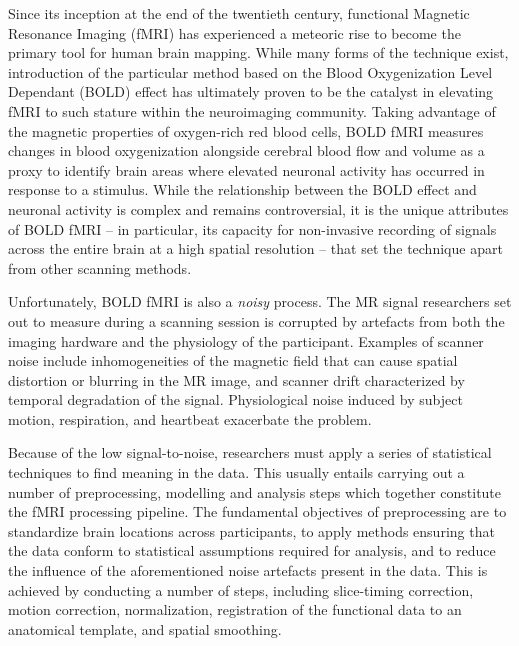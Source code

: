 Since its inception at the end of the twentieth century, functional Magnetic Resonance Imaging (fMRI) has experienced a meteoric rise to become the primary tool for human brain mapping. While many forms of the technique exist, introduction of the particular method based on the Blood Oxygenization Level Dependant (BOLD) effect has ultimately proven to be the catalyst in elevating fMRI to such stature within the neuroimaging community. Taking advantage of the magnetic properties of oxygen-rich red blood cells, BOLD fMRI measures changes in blood oxygenization alongside cerebral blood flow and volume as a proxy to identify brain areas where elevated neuronal activity has occurred in response to a stimulus. While the relationship between the BOLD effect and neuronal activity is complex and remains controversial, it is the unique attributes of BOLD fMRI -- in particular, its capacity for non-invasive recording of signals across the entire brain at a high spatial resolution -- that set the technique apart from other scanning methods.

Unfortunately, BOLD fMRI is also a \textit{noisy} process. The MR signal researchers set out to measure during a scanning session is corrupted by artefacts from both the imaging hardware and the physiology of the participant. Examples of scanner noise include inhomogeneities of the magnetic field that can cause spatial distortion or blurring in the MR image, and scanner drift characterized by temporal degradation of the signal. Physiological noise induced by subject motion, respiration, and heartbeat exacerbate the problem. 

Because of the low signal-to-noise, researchers must apply a series of statistical techniques to find meaning in the data. This usually entails carrying out a number of preprocessing, modelling and analysis steps which together constitute the fMRI processing pipeline. The fundamental objectives of preprocessing are to standardize brain locations across participants, to apply methods ensuring that the data conform to statistical assumptions required for analysis, and to reduce the influence of the aforementioned noise artefacts present in the data. This is achieved by conducting a number of steps, including slice-timing correction, motion correction, normalization, registration of the functional data to an anatomical template, and spatial smoothing. 

